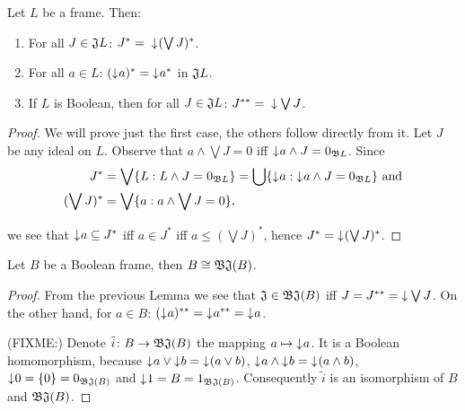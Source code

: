 \begin{lemma} Let $L$ be a frame. Then:
    \begin{enumerate}
        \item For all $J \in \mathfrak{J} L$: $J^* =\;\mathord{\downarrow}\mkern1mu (\bigvee J)^*$.
        \item For all $a \in L$: $(\mathord{\downarrow}\mkern1mu a)^* = \mathord{\downarrow}\mkern1mu a^*$ in $\mathfrak{J} L$.
        \item If $L$ is Boolean, then for all $J \in \mathfrak{J} L$: $J^{**} =\;\mathord{\downarrow}\mkern1mu \bigvee J$.
    \end{enumerate}
\end{lemma}
\begin{proof}
    We will prove just the first case, the others follow directly from it. Let $J$ be any ideal on $L$. Observe that $a \wedge \bigvee J = 0 $ iff $\mathord{\downarrow}\mkern1mu a \wedge J = 0_{\mathfrak{B} L}$. Since
        \begin{align*}
            J^* & = \bigvee \{ L : L \wedge J = 0_{\mathfrak{B} L} \} = \bigcup \{ \mathord{\downarrow}\mkern1mu a : \mathord{\downarrow}\mkern1mu a \wedge J = 0_{\mathfrak{B} L} \} \text{ and}\\
            (\bigvee J)^* & = \bigvee \{ a : a \wedge \bigvee J = 0 \},
        \end{align*}

    \noindent we see that $\mathord{\downarrow}\mkern1mu a \subseteq J^*$ iff $a \in J^*$ iff $a \leq (\bigvee J)^*$, hence $J^* = \mathord{\downarrow}\mkern1mu (\bigvee J)^*$.
\end{proof}

\begin{proposition}
    Let $B$ be a Boolean frame, then $B \cong \mathfrak{B}\mathfrak{J}(B)$.
\end{proposition}
\begin{proof}
    From the previous Lemma we see that $\mathfrak{J} \in \mathfrak{B}\mathfrak{J}(B)$ iff $J = J^{**} = \mathord{\downarrow}\mkern1mu \bigvee J$. On the other hand, for $a \in B$: $(\mathord{\downarrow}\mkern1mu a)^{**} = \mathord{\downarrow}\mkern1mu a^{**} = \mathord{\downarrow}\mkern1mu a$.

    (FIXME:) Denote $\tilde i\colon B \to \mathfrak{B}\mathfrak{J}(B)$ the mapping $a \mapsto \mathord{\downarrow}\mkern1mu a$. It is a Boolean homomorphism, because $\mathord{\downarrow}\mkern1mu a \vee \mathord{\downarrow}\mkern1mu b = \mathord{\downarrow}\mkern1mu (a \vee b)$, $\mathord{\downarrow}\mkern1mu a \wedge \mathord{\downarrow}\mkern1mu b = \mathord{\downarrow}\mkern1mu (a \wedge b)$, $\mathord{\downarrow}\mkern1mu 0 = \{0\} = 0_{\mathfrak{B}\mathfrak{J}(B)}$ and $\mathord{\downarrow}\mkern1mu 1 = B = 1_{\mathfrak{B}\mathfrak{J}(B)}$. Consequently $\tilde i$ is an isomorphism of $B$ and $\mathfrak{B}\mathfrak{J}(B)$.
\end{proof}

